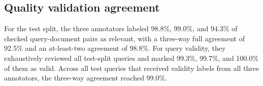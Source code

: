 \subsection{Quality validation agreement}
For the test split, the three annotators labeled 98.8\%, 99.0\%, and 94.3\% of checked query-document pairs as relevant, with a three-way full agreement of 92.5\% and an at-least-two agreement of 98.8\%. For query validity, they exhaustively reviewed all test-split queries and marked 99.3\%, 99.7\%, and 100.0\% of them as valid. Across all test queries that received validity labels from all three annotators, the three-way agreement reached 99.0\%.